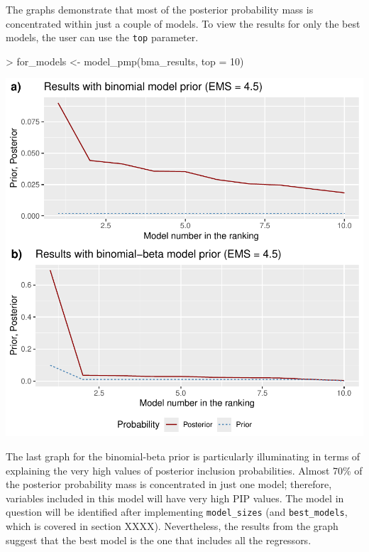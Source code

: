 \documentclass[a4paper]{article}
\begin{document}
The graphs demonstrate that most of the posterior probability mass is concentrated within just a couple of models. To view the results for only the best models, the user can use the \verb+top+ parameter.
\begin{Schunk}
\begin{Sinput}
> for_models <- model_pmp(bma_results, top = 10)
\end{Sinput}
\end{Schunk}
\includegraphics{bdsm_vignette-015}

The last graph for the binomial-beta prior is particularly illuminating in terms of explaining the very high values of posterior inclusion probabilities. Almost 70\% of the posterior probability mass is concentrated in just one model; therefore, variables included in this model will have very high PIP values. The model in question will be identified after implementing \verb+model_sizes+ (and \verb+best_models+, which is covered in section XXXX). Nevertheless, the results from the graph suggest that the best model is the one that includes all the regressors.
\end{document}
